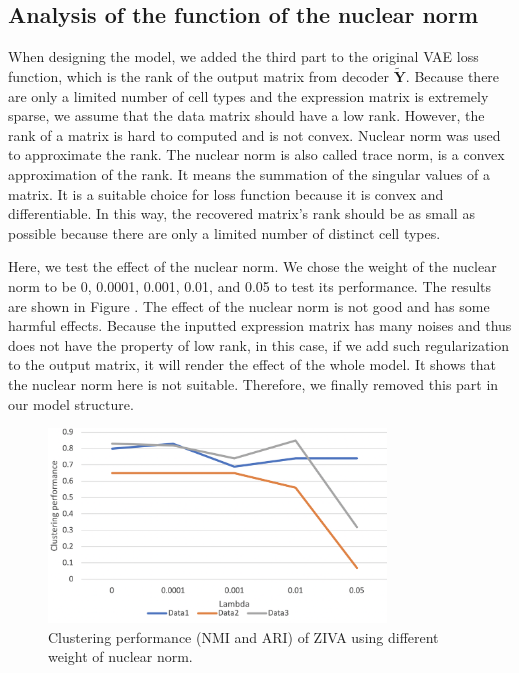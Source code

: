 \clearpage

\subsection{Analysis of the function of the nuclear norm}
When designing the model, we added the third part to the original VAE loss function, which is the rank of the output matrix from decoder $\widetilde{\boldsymbol{Y}}$. Because there are only a limited number of cell types and the expression matrix is extremely sparse, we assume that the data matrix should have a low rank. However, the rank of a matrix is hard to computed and is not convex. Nuclear norm \cite{Zhang_2010} was used to approximate the rank. The nuclear norm is also called trace norm, is a convex approximation of the rank. It means the summation of the singular values of a matrix. It is a suitable choice for loss function because it is convex and differentiable. In this way, the recovered matrix's rank should be as small as possible because there are only a limited number of distinct cell types.

Here, we test the effect of the nuclear norm. We chose the weight of the nuclear norm to be 0, 0.0001, 0.001, 0.01, and 0.05 to test its performance. The results are shown in Figure \cite{nuclear}. The effect of the nuclear norm is not good and has some harmful effects. Because the inputted expression matrix has many noises and thus does not have the property of low rank, in this case, if we add such regularization to the output matrix, it will render the effect of the whole model. It shows that the nuclear norm here is not suitable. Therefore, we finally removed this part in our model structure.

\begin{figure}[htb!]
    \centering
    \includegraphics[width=0.8\textwidth]{figures/myfigures/nuclear.png}
    \caption{Clustering performance (NMI and ARI) of ZIVA using different weight of nuclear norm.}
    \label{nuclear}
\end{figure}

